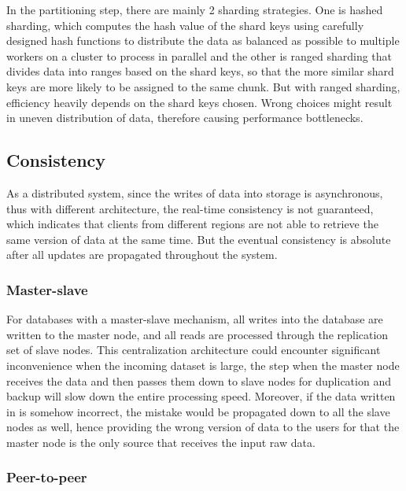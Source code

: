 \noindent In the partitioning step, there are mainly 2 sharding strategies. One is hashed sharding, which computes the hash value of the shard keys using carefully designed hash functions to distribute the data as balanced as possible to multiple workers on a cluster to process in parallel and the other is ranged sharding that divides data into ranges based on the shard keys, so that the more similar shard keys are more likely to be assigned to the same chunk. But with ranged sharding, efficiency heavily depends on the shard keys chosen. Wrong choices might result in uneven distribution of data, therefore causing performance bottlenecks. 


\subsection{Consistency}\mbox{}

\noindent As a distributed system, since the writes of data into storage is asynchronous, thus with different architecture, the real-time consistency is not guaranteed, which indicates that clients from different regions are not able to retrieve the same version of data at the same time. But the eventual consistency is absolute after all updates are propagated throughout the system.

\subsubsection{Master-slave}\mbox{}

\noindent For databases with a master-slave mechanism, all writes into the database are written to the master node, and all reads are processed through the replication set of slave nodes. This centralization architecture could encounter significant inconvenience when the incoming dataset is large, the step when the master node receives the data and then passes them down to slave nodes for duplication and backup will slow down the entire processing speed. Moreover, if the data written in is somehow incorrect, the mistake would be propagated down to all the slave nodes as well, hence providing the wrong version of data to the users for that the master node is the only source that receives the input raw data.

\subsubsection{Peer-to-peer}\mbox{}

